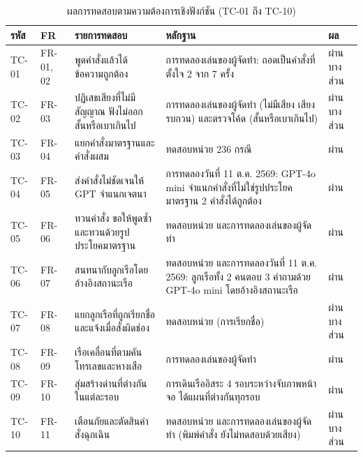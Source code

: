 \begin{table}[!htbp]
\centering
\caption{ผลการทดสอบตามความต้องการเชิงฟังก์ชัน (TC-01 ถึง TC-10)}
\label{tab:test_result}
\begin{tabular}{|L{1.12cm}|L{1.21cm}|L{5.04cm}|L{3.36cm}|L{1.68cm}|}
\hline
\textbf{รหัส} & \textbf{FR} & \textbf{รายการทดสอบ} & \textbf{หลักฐาน} & \textbf{ผล} \\
\hline
TC-01 & FR-01, 02 & พูดคำสั่งแล้วได้ข้อความถูกต้อง & การทดลองเล่นของผู้จัดทำ: ถอดเป็นคำสั่งที่ตั้งใจ 2 จาก 7 ครั้ง & ผ่านบางส่วน \\ \hline
TC-02 & FR-03 & ปฏิเสธเสียงที่ไม่มีสัญญาณ ฟังไม่ออก สั้นหรือเบาเกินไป & การทดลองเล่นของผู้จัดทำ (ไม่มีเสียง เสียงรบกวน) และตรวจโค้ด (สั้นหรือเบาเกินไป) & ผ่านบางส่วน \\ \hline
TC-03 & FR-04 & แยกคำสั่งมาตรฐานและคำสั่งผสม & ทดสอบหน่วย 236 กรณี & ผ่าน \\ \hline
TC-04 & FR-05 & ส่งคำสั่งไม่ชัดเจนให้ GPT จำแนกเจตนา & การทดลองวันที่ 11 ต.ค. 2569: GPT-4o mini จำแนกคำสั่งที่ไม่ใช่รูปประโยคมาตรฐาน 2 คำสั่งได้ถูกต้อง & ผ่าน \\ \hline
TC-05 & FR-06 & ทวนคำสั่ง ขอให้พูดซ้ำ และทวนด้วยรูปประโยคมาตรฐาน & ทดสอบหน่วย และการทดลองเล่นของผู้จัดทำ & ผ่าน \\ \hline
TC-06 & FR-07 & สนทนากับลูกเรือโดยอ้างอิงสถานะเรือ & ทดสอบหน่วย และการทดลองวันที่ 11 ต.ค. 2569: ลูกเรือทั้ง 2 คนตอบ 3 คำถามด้วย GPT-4o mini โดยอ้างอิงสถานะเรือ & ผ่าน \\ \hline
TC-07 & FR-08 & แยกลูกเรือที่ถูกเรียกชื่อและแจ้งเมื่อสั่งผิดช่อง & ทดสอบหน่วย (การเรียกชื่อ) & ผ่านบางส่วน \\ \hline
TC-08 & FR-09 & เรือเคลื่อนที่ตามคันโทรเลขและหางเสือ & การทดลองเล่นของผู้จัดทำ & ผ่าน \\ \hline
TC-09 & FR-10 & สุ่มสร้างด่านที่ต่างกันในแต่ละรอบ & การเดินเรืออิสระ 4 รอบระหว่างจับภาพหน้าจอ ได้แผนที่ต่างกันทุกรอบ & ผ่าน \\ \hline
TC-10 & FR-11 & เตือนภัยและตัดสินคำสั่งฉุกเฉิน & ทดสอบหน่วย และการทดลองเล่นของผู้จัดทำ (พิมพ์คำสั่ง ยังไม่ทดสอบด้วยเสียง) & ผ่านบางส่วน \\ \hline
\end{tabular}
\end{table}

